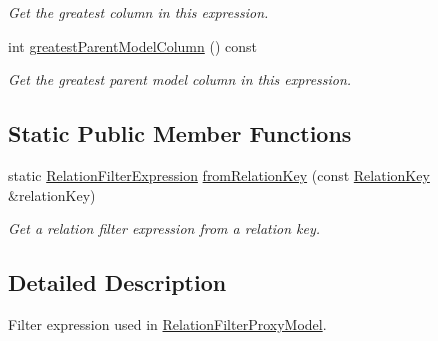 \begin{DoxyCompactItemize}
\begin{DoxyCompactList}\small\item\em Get the greatest column in this expression. \end{DoxyCompactList}\item 
int \hyperlink{class_mdt_1_1_item_model_1_1_relation_filter_expression_a9008ca4017f2c05c985cae66144ebe2f}{greatest\+Parent\+Model\+Column} () const \hypertarget{class_mdt_1_1_item_model_1_1_relation_filter_expression_a9008ca4017f2c05c985cae66144ebe2f}{}\label{class_mdt_1_1_item_model_1_1_relation_filter_expression_a9008ca4017f2c05c985cae66144ebe2f}

\begin{DoxyCompactList}\small\item\em Get the greatest parent model column in this expression. \end{DoxyCompactList}\end{DoxyCompactItemize}
\subsection*{Static Public Member Functions}
\begin{DoxyCompactItemize}
\item 
static \hyperlink{class_mdt_1_1_item_model_1_1_relation_filter_expression}{Relation\+Filter\+Expression} \hyperlink{class_mdt_1_1_item_model_1_1_relation_filter_expression_aed958ff87bd83aac0c3cb40605f22588}{from\+Relation\+Key} (const \hyperlink{class_mdt_1_1_item_model_1_1_relation_key}{Relation\+Key} \&relation\+Key)
\begin{DoxyCompactList}\small\item\em Get a relation filter expression from a relation key. \end{DoxyCompactList}\end{DoxyCompactItemize}


\subsection{Detailed Description}
Filter expression used in \hyperlink{class_mdt_1_1_item_model_1_1_relation_filter_proxy_model}{Relation\+Filter\+Proxy\+Model}. 


